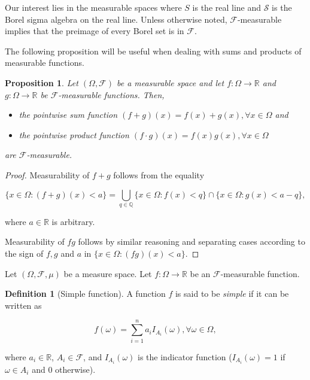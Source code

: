 \documentclass{book}
\theoremstyle{plain}%
\newtheorem{proposition}{Proposition}[section]
\theoremstyle{definition}
\newtheorem{definition}{Definition}[section]
\newlength{\arrow}
\begin{document}
Our interest lies in the measurable spaces where $S$ is the real line and $\mathcal{S}$ is the Borel sigma algebra on the real line. Unless otherwise noted, $\mathcal{F}$-measurable implies that the preimage of every Borel set is in $\mathcal{F}$.

The following proposition will be useful when dealing with sums and products of measurable functions.

\begin{proposition}
Let $(\Omega, \mathcal{F})$ be a measurable space and let $f: \Omega \rightarrow \mathbb{R}$ and $g: \Omega \rightarrow \mathbb{R}$ be $\mathcal{F}$-measurable functions. Then,

\begin{itemize}
\item the pointwise sum function $(f+g)(x) = f(x) + g(x), \forall x \in \Omega$ and
\item the pointwise product function $(f \cdot g)(x) = f(x)g(x), \forall x \in \Omega$
\end{itemize}

are $\mathcal{F}$-measurable.
\end{proposition}

\begin{proof}
Measurability of $f+g$ follows from the equality

    $$
    \{x\in \Omega\colon (f+g)(x)< a\}
    =
    \bigcup_{q\in \mathbb{Q}}
    \{x\in \Omega\colon f(x)<q\}
    \cap
    \{x\in \Omega\colon g(x)<a-q\},
    $$

where $a\in \mathbb{R}$ is arbitrary.
    
Measurability of $fg$ follows by similar reasoning and separating cases according to the sign of $f,g$ and $a$ in $\{x\in \Omega\colon (fg)(x)<a\}$.
\end{proof}    

Let $(\Omega, \mathcal{F}, \mu)$ be a measure space. Let $f: \Omega \rightarrow \mathbb{R}$ be an $\mathcal{F}$-measurable function.

\begin{definition}[Simple function]
A function $f$ is said to be \emph{simple} if it can be written as

$$f(\omega) = \sum_{i=1}^n a_i I_{A_i}(\omega), \forall \omega \in \Omega,$$

where $a_i \in \mathbb{R}$, $A_i \in \mathcal{F}$, and $I_{A_i}(\omega)$ is the indicator function ($I_{A_i}(\omega) = 1$ if $\omega \in A_i$ and 0 otherwise).
\end{definition}
\end{document}

